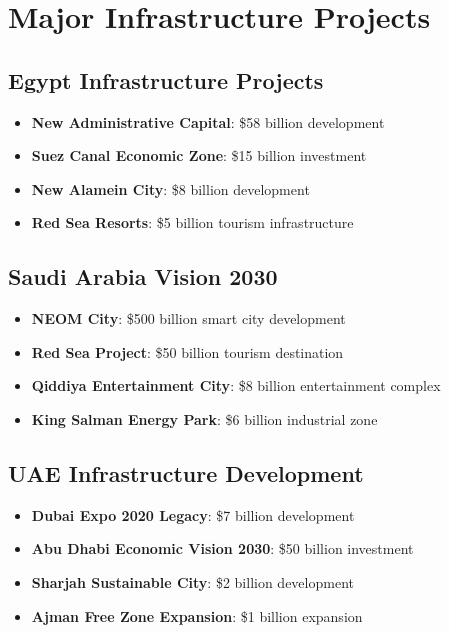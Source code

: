 \documentclass[business]{../templates/infraradar-main}
\begin{document}
\section{Major Infrastructure Projects}

\subsection{Egypt Infrastructure Projects}
\begin{itemize}
    \item \textbf{New Administrative Capital}: \$58 billion development
    \item \textbf{Suez Canal Economic Zone}: \$15 billion investment
    \item \textbf{New Alamein City}: \$8 billion development
    \item \textbf{Red Sea Resorts}: \$5 billion tourism infrastructure
\end{itemize}

\subsection{Saudi Arabia Vision 2030}
\begin{itemize}
    \item \textbf{NEOM City}: \$500 billion smart city development
    \item \textbf{Red Sea Project}: \$50 billion tourism destination
    \item \textbf{Qiddiya Entertainment City}: \$8 billion entertainment complex
    \item \textbf{King Salman Energy Park}: \$6 billion industrial zone
\end{itemize}

\subsection{UAE Infrastructure Development}
\begin{itemize}
    \item \textbf{Dubai Expo 2020 Legacy}: \$7 billion development
    \item \textbf{Abu Dhabi Economic Vision 2030}: \$50 billion investment
    \item \textbf{Sharjah Sustainable City}: \$2 billion development
    \item \textbf{Ajman Free Zone Expansion}: \$1 billion expansion
\end{itemize}
\end{document}
